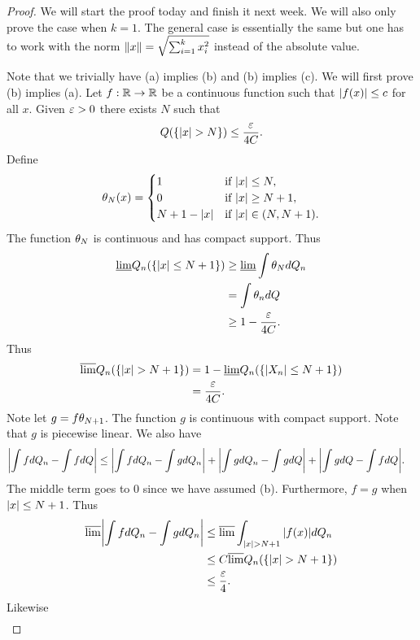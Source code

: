 \begin{proof}
    We will start the proof today and finish it next week. We will also only prove the case when $k=1$. The general case is essentially the same but one has to work with the norm $\left\|x\right\|=\sqrt{\sum_{i=1}^k x_i^2}$ instead of the absolute value.
    
    Note that we trivially have (a) implies (b) and (b) implies (c). We will first prove (b) implies (a). Let $f:{\mathbb R} \to {\mathbb R}$ be a continuous function such that ${\left\lvert f(x)\right\rvert} \le c$ for all $x$. Given $\varepsilon >0$ there exists $N$ such that 
    \[Q(\{{\left\lvert x\right\rvert}> N\}) \le \frac{\varepsilon}{4C}. \]
    Define \[{\theta}_N(x) = \begin{cases}
        1 & \text{if } {\left\lvert x\right\rvert} \le N,\\
        0 & \text{if } {\left\lvert x\right\rvert} \ge N+1,\\
        N+1-{\left\lvert x\right\rvert} &\text{if } {\left\lvert x\right\rvert} \in (N,N+1).
    \end{cases}\] 
    The function ${\theta}_N$ is continuous and has compact support. Thus
    \begin{align*}
        \underline{\lim}Q_n(\{{\left\lvert x\right\rvert} \le N+1\}) &\ge \underline{\lim}\int {\theta}_N dQ_n\\
        &= \int {\theta}_n dQ\\
        &\ge 1-\frac{\varepsilon}{4C}.
    \end{align*}
    Thus
    \begin{align*}
        \overline{\lim}Q_n(\{{\left\lvert x\right\rvert}>N+1\})&=1-\underline{\lim}Q_n(\{{\left\lvert X_n\right\rvert}\le N+1\})\\
        &= \frac{\varepsilon}{4C}.
    \end{align*}
    Note let $g=f{\theta}_{N+1}$. The function $g$ is continuous with compact support. Note that $g$ is piecewise linear. We also have 
    \begin{align*}
        {\left\lvert\int f dQ_n - \int f dQ\right\rvert} &\le {\left\lvert\int f dQ_n - \int g dQ_n\right\rvert} + {\left\lvert\int g dQ_n - \int g dQ\right\rvert}+{\left\lvert\int g dQ-\int fdQ\right\rvert}.
    \end{align*}
    The middle term goes to 0 since we have assumed (b). Furthermore, $f=g$ when ${\left\lvert x\right\rvert} \le N+1$. Thus
    \begin{align*}
        \overline{\lim} {\left\lvert\int f dQ_n - \int g dQ_n\right\rvert} &\le\overline{\lim}\int_{{\left\lvert x\right\rvert} > N+1} {\left\lvert f(x)\right\rvert} dQ_n\\
        &\le C\overline{\lim} Q_n(\{{\left\lvert x\right\rvert}>N+1\})\\
        &\le \frac{\varepsilon}{4}.
    \end{align*}
    Likewise 
    \begin{align*}

\end{align*}
\end{proof}
